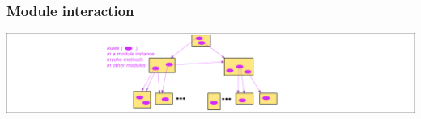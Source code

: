 
\begin{frame}
\frametitle{Module interaction}

\begin{center}
\includegraphics[width=\textwidth]{../Figures/Fig_BSV_module_interaction}
\end{center}

\end{frame}



